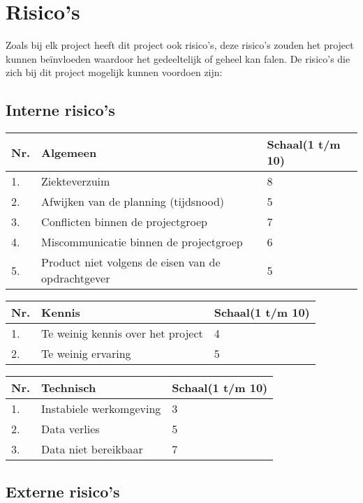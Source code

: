 \chapter{Risico's} \label{cha:risicos}

Zoals bij elk project heeft dit project ook risico’s, deze risico’s zouden het project kunnen beïnvloeden waardoor het gedeeltelijk of geheel kan falen. De risico’s die zich bij dit project mogelijk kunnen voordoen zijn:

\section{Interne risico's} \label{sec:Interne risicos}


\begin{tabular}{ | l | l | l | }
    \hline
    Nr. & Algemeen & Schaal(1 t/m 10) \\ \hline
    1.	& Ziekteverzuim & 8 \\ \hline
    2.  & Afwijken van de planning (tijdsnood) & 5 \\ \hline
    3.  & Conflicten binnen de projectgroep & 7 \\ \hline
    4.  & Miscommunicatie binnen de projectgroep & 6 \\ \hline
    5.  & Product niet volgens de eisen van de opdrachtgever & 5 \\ \hline
\end{tabular}

\bigskip
\begin{tabular}{ | l | l | l | }
	\hline
    Nr. & Kennis & Schaal(1 t/m 10) \\ \hline
    1.	& Te weinig kennis over het project & 4 \\ \hline
    2.  & Te weinig ervaring & 5 \\ \hline
\end{tabular}

\bigskip
\begin{tabular}{ | l | l | l | }
    \hline
    Nr. & Technisch & Schaal(1 t/m 10) \\ \hline
    1.	& Instabiele werkomgeving & 3 \\ \hline
    2.  & Data verlies & 5 \\ \hline
    3.  & Data niet bereikbaar & 7 \\ \hline
\end{tabular}

\section{Externe risico's} \label{sec:Externe risicos}

